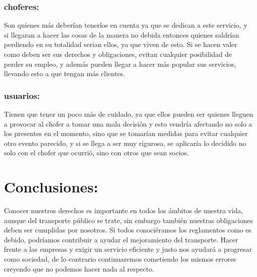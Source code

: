 \documentclass{bmcart}
\begin{document}
\subsubsection{choferes:}
Son quienes más deberían tenerlos en cuenta ya que se dedican a este servicio, y si llegaran a hacer las cosas de la manera no debida entonces quienes saldrían perdiendo en su totalidad serian ellos, ya que viven de esto.
Si se hacen valer como deben ser sus derechos y obligaciones, evitan cualquier posibilidad de perder su empleo, y además pueden llegar a hacer más popular sus servicios, llevando esto a que tengan más clientes.

\subsubsection{usuarios:}
Tienen que tener un poco más de cuidado, ya que ellos pueden ser quienes lleguen a provocar al chofer a tomar una mala decisión y esto vendría afectando no solo a los presentes en el momento, sino que se tomarían medidas para evitar cualquier otro evento parecido, y si se llega a ser muy rigurosa, se aplicaría lo decidido no solo con el chofer que ocurrió, sino con otros que sean socios.

\section*{Conclusiones:}
Conocer nuestros derechos es importante en todos los ámbitos de nuestra vida, aunque del transporte público se trate, sin embargo también nuestras obligaciones deben ser cumplidas por nosotros. Si todos conociéramos los reglamentos como es debido, podríamos contribuir a ayudar el mejoramiento del transporte. Hacer frente a las empresas y exigir un servicio eficiente y justo nos ayudará a progresar como sociedad, de lo contrario continuaremos cometiendo los mismos errores creyendo que no podemos hacer nada al respecto. 



\end{document}

